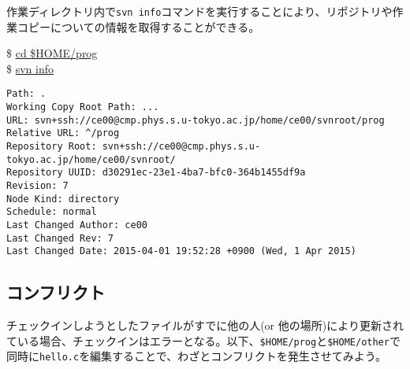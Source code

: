 \documentclass[a4j]{jsbook}
\newcommand{\prompt}{\$ }
\newenvironment{commandline2}{%
  \begin{tcolorbox}\tt%
}{%
  \end{tcolorbox}%
}
\begin{document}
作業ディレクトリ内で{\tt svn info}コマンドを実行することにより、リポジトリや作業コピーについての情報を取得することができる。
\begin{commandline2}
\prompt \underline{cd \$HOME/prog} \\
\prompt \underline{svn info}
\vspace*{-.7em} 
\begin{verbatim}
Path: .
Working Copy Root Path: ...
URL: svn+ssh://ce00@cmp.phys.s.u-tokyo.ac.jp/home/ce00/svnroot/prog
Relative URL: ^/prog
Repository Root: svn+ssh://ce00@cmp.phys.s.u-tokyo.ac.jp/home/ce00/svnroot/
Repository UUID: d30291ec-23e1-4ba7-bfc0-364b1455df9a
Revision: 7
Node Kind: directory
Schedule: normal
Last Changed Author: ce00
Last Changed Rev: 7
Last Changed Date: 2015-04-01 19:52:28 +0900 (Wed, 1 Apr 2015)
\end{verbatim}
\end{commandline2} \noindent

\subsection{コンフリクト}

チェックインしようとしたファイルがすでに他の人(or 他の場所)により更新されている場合、チェックインはエラーとなる。以下、{\tt \$HOME/prog}と{\tt \$HOME/other}で同時に{\tt hello.c}を編集することで、わざとコンフリクトを発生させてみよう。
\end{document}
